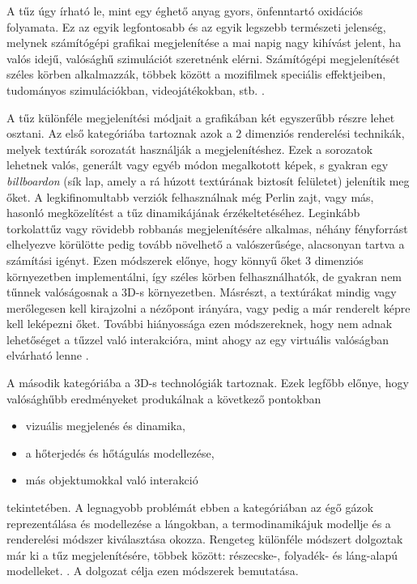 
A tűz úgy írható le, mint egy éghető anyag gyors, önfenntartó oxidációs folyamata. Ez az egyik legfontosabb és az egyik legszebb természeti jelenség, melynek számítógépi grafikai megjelenítése a mai napig nagy kihívást jelent, ha valós idejű, valósághű szimulációt szeretnénk elérni. Számítógépi megjelenítését széles körben alkalmazzák, többek között a mozifilmek speciális effektjeiben, tudományos szimulációkban, videojátékokban, stb. \cite{steinemannFire}.

A tűz különféle megjelenítési módjait a grafikában két egyszerűbb részre lehet osztani. Az első kategóriába tartoznak azok a 2 dimenziós renderelési technikák, melyek textúrák sorozatát használják a megjelenítéshez. Ezek a sorozatok lehetnek valós, generált vagy egyéb módon megalkotott képek, s gyakran egy \textit{billboardon} (sík lap, amely a rá húzott textúrának biztosít felületet) jelenítik meg őket. A legkifinomultabb verziók felhasználnak még Perlin zajt, vagy más, hasonló megközelítést a tűz dinamikájának érzékeltetéséhez. Leginkább torkolattűz vagy rövidebb robbanás megjelenítésére alkalmas, néhány fényforrást elhelyezve körülötte pedig tovább növelhető a valószerűsége, alacsonyan tartva a számítási igényt. Ezen módszerek előnye, hogy könnyű őket 3 dimenziós környezetben implementálni, így széles körben felhasználhatók, de gyakran nem tűnnek valóságosnak a 3D-s környezetben. Másrészt, a textúrákat mindig vagy merőlegesen kell kirajzolni a nézőpont irányára, vagy pedig a már renderelt képre kell leképezni őket. További hiányossága ezen módszereknek, hogy nem adnak lehetőséget a tűzzel való interakcióra, mint ahogy az egy virtuális valóságban elvárható lenne \cite{steinemannFire}.

A második kategóriába a 3D-s technológiák tartoznak. Ezek legfőbb előnye, hogy valósághűbb eredményeket produkálnak a következő pontokban
\begin{itemize}
\item vizuális megjelenés és dinamika,
\item a hőterjedés és hőtágulás modellezése,
\item más objektumokkal való interakció
\end{itemize}
tekintetében. A legnagyobb problémát ebben a kategóriában az égő gázok reprezentálása és modellezése a lángokban, a termodinamikájuk modellje és a renderelési módszer kiválasztása okozza.
Rengeteg különféle módszert dolgoztak már ki a tűz megjelenítésére, többek között: részecske-, folyadék- és láng-alapú modelleket. \cite{steinemannFire}. A dolgozat célja ezen módszerek bemutatása.
